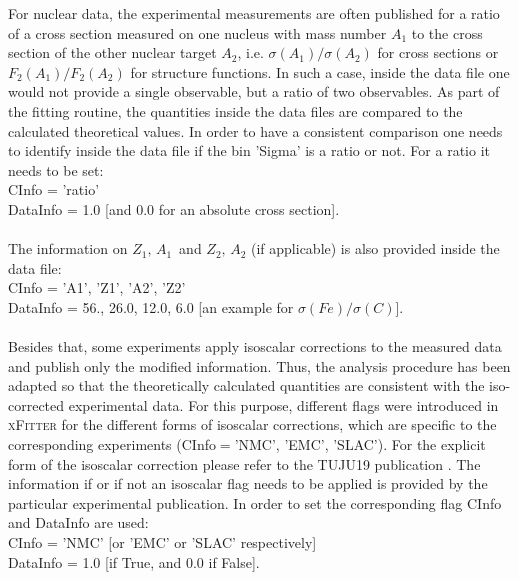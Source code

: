 \documentclass{article}
\begin{document}
For nuclear data, the experimental measurements are often published for a ratio of a cross section measured on one nucleus with mass number $A_1$ to the cross section of the other nuclear target $A_2$, i.e. $\sigma(A_1)/\sigma(A_2)$ for cross sections or $F_2(A_1)/F_2(A_2)$ for structure functions. In such a case, inside the data file one would not provide a single observable, but a ratio of two observables. As part of the fitting routine, the quantities inside the data files are compared to the calculated theoretical values. In order to have a consistent comparison one needs to identify inside the data file if the bin 'Sigma' is a ratio or not. For a ratio it needs to be set:\\
\hspace*{0.5cm}CInfo = 'ratio'\\
\hspace*{0.5cm}DataInfo = 1.0 [and 0.0 for an absolute cross section].\\
\\
The information on $Z_1,\,A_1\,$ and $Z_2,\,A_2$ (if applicable) is also provided inside the data file:\\
\hspace*{0.5cm}CInfo = 'A1', 'Z1', 'A2', 'Z2'\\
\hspace*{0.5cm}DataInfo = 56., 26.0, 12.0, 6.0 [an example for $\sigma(Fe)/\sigma(C)$].\\
\\
Besides that, some experiments apply isoscalar corrections to the measured data and publish only the modified information. Thus, the analysis procedure has been adapted so that the theoretically calculated quantities are consistent with the iso-corrected experimental data. For this purpose, different flags were introduced in \textsc{xFitter} for the different forms of isoscalar corrections, which are specific to the corresponding experiments (CInfo$=$'NMC', 'EMC', 'SLAC'). For the explicit form of the isoscalar correction please refer to the TUJU19 publication \cite{Walt:2019slu}. The information if or if not an isoscalar flag needs to be applied is provided by the particular experimental publication. In order to set the corresponding flag CInfo and DataInfo are used:\\
\hspace*{0.5cm}CInfo = 'NMC' [or 'EMC' or 'SLAC' respectively]\\
\hspace*{0.5cm}DataInfo = 1.0 [if True, and 0.0 if False].\\
\end{document}
